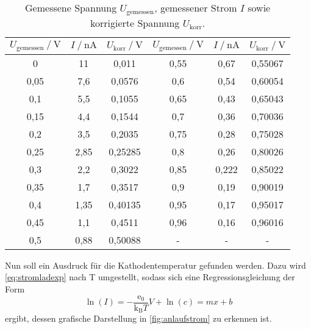 \begin{table}
    \centering
    \caption{Gemessene Spannung $U_\text{gemessen}$, gemessener Strom $I$ sowie korrigierte Spannung $U_\text{korr}$.}
    \label{tab:anlaufstrom}
    \begin{tabular}{S[table-format=1.2] S[table-format=2.3] S S[table-format=1.2] S[table-format=2.3] S}
        \toprule
        {$U_\text{gemessen} \mathbin{/} \unit{\volt}$} & {$I \mathbin{/} \unit{\nano\ampere}$} & {$U_\text{korr} \mathbin{/} \unit{\volt}$}&{$U_\text{gemessen} \mathbin{/} \unit{\volt}$} & {$I \mathbin{/} \unit{\nano\ampere}$} & {$U_\text{korr} \mathbin{/} \unit{\volt}$} \\
                 &       11    &   0,011   & 0,55      &       0,67  &   0,55067 \\     
        0,05      &       7,6   &   0,0576  & 0,6       &       0,54  &   0,60054 \\         
        0,1       &       5,5   &   0,1055  & 0,65      &       0,43  &   0,65043 \\     
        0,15      &       4,4   &   0,1544  & 0,7       &       0,36  &   0,70036 \\      
        0,2       &       3,5   &   0,2035  & 0,75      &       0,28  &   0,75028 \\     
        0,25      &       2,85  &   0,25285 & 0,8       &       0,26  &   0,80026 \\      
        0,3       &       2,2   &   0,3022  & 0,85      &       0,222 &   0,85022 \\     
        0,35      &       1,7   &   0,3517  & 0,9       &       0,19  &   0,90019 \\      
        0,4       &       1,35  &   0,40135 & 0,95      &       0,17  &   0,95017 \\     
        0,45      &       1,1   &   0,4511  & 0,96      &       0,16  &   0,96016 \\     
        0,5       &       0,88  &   0,50088 & {-}       &{-}          &         {-}\\           
        \bottomrule
    \end{tabular}
\end{table}

Nun soll ein Ausdruck für die Kathodentemperatur gefunden werden.
Dazu wird \eqref{eq:stromladexp} nach T umgestellt, sodass sich eine Regressionsgleichung der Form
\begin{equation*}
    \ln(I) = -\dfrac{\text{e}_0}{\text{k}_\text{B} T} V + \ln(c) = m x + b
\end{equation*}
ergibt, dessen grafische Darstellung in \autoref{fig:anlaufstrom} zu erkennen ist.

